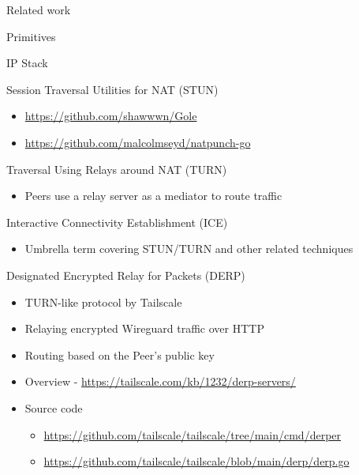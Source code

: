 \begin{frame}[fragile]{Related work}
\begin{block}{Primitives}
\begin{block}{IP Stack}
\begin{block}{Session Traversal Utilities for NAT (STUN)}
\begin{itemize}
  \begin{itemize}
  \tightlist
  \item
    \url{https://github.com/shawwwn/Gole}
  \item
    \url{https://github.com/malcolmseyd/natpunch-go}
  \end{itemize}
\end{itemize}
\end{block}

\begin{block}{Traversal Using Relays around NAT (TURN)}
\protect\hypertarget{traversal-using-relays-around-nat-turn}{}
\begin{itemize}
\tightlist
\item
  Peers use a relay server as a mediator to route traffic
\end{itemize}
\end{block}

\begin{block}{Interactive Connectivity Establishment (ICE)}
\protect\hypertarget{interactive-connectivity-establishment-ice}{}
\begin{itemize}
\tightlist
\item
  Umbrella term covering STUN/TURN and other related techniques
\end{itemize}
\end{block}

\begin{block}{Designated Encrypted Relay for Packets (DERP)}
\protect\hypertarget{designated-encrypted-relay-for-packets-derp}{}
\begin{itemize}
\tightlist
\item
  TURN-like protocol by Tailscale
\item
  Relaying encrypted Wireguard traffic over HTTP
\item
  Routing based on the Peer's public key
\item
  Overview - \url{https://tailscale.com/kb/1232/derp-servers/}
\item
  Source code

  \begin{itemize}
  \tightlist
  \item
    \url{https://github.com/tailscale/tailscale/tree/main/cmd/derper}
  \item
    \url{https://github.com/tailscale/tailscale/blob/main/derp/derp.go}
  \end{itemize}
\end{itemize}
\end{block}
\end{block}


\end{block}
\end{frame}
